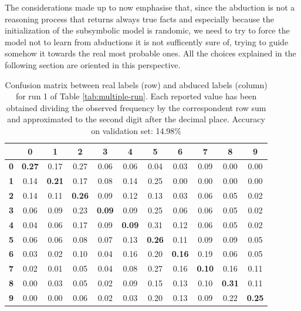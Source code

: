 The considerations made up to now emphasise that, since the abduction is not a reasoning process that returns always true facts and especially because the initialization of the subsymbolic model is randomic, we need to try to force the model not to learn from abductions it is not sufficently sure of, trying to guide somehow it towards the real most probable ones. All the choices explained in the following section are oriented in this perspective.

\begin{table}[H]
  \caption{Confusion matrix between real labels (row) and abduced labels (column) for run 1 of Table \ref{tab:multiple-run}. Each reported value has been obtained dividing the observed frequency by the correspondent row sum and approximated to the second digit after the decimal place. Accuracy on validation set: 14.98\%}
  \label{tab:confusion-matrix-1}
  \centering
  \begin{tabular}{ccccccccccc}  
						& \textbf{0} & \textbf{1} & \textbf{2} & \textbf{3} & \textbf{4} & \textbf{5} & \textbf{6} & \textbf{7} & \textbf{8} & \textbf{9}\\
	\hline
	\textbf{0}			& \textbf{0.27} & 0.17 & 0.27 & 0.06 & 0.06 & 0.04 & 0.03 & 0.09 & 0.00 & 0.00  \\
	\hline
	\textbf{1}			& 0.14 & \textbf{0.21} & 0.17 & 0.08 & 0.14 & 0.25 & 0.00 & 0.00 & 0.00 & 0.00  \\
	\hline
	\textbf{2}			& 0.14 & 0.11 & \textbf{0.26} & 0.09 & 0.12 & 0.13 & 0.03 & 0.06 & 0.05 & 0.02  \\
	\hline
	\textbf{3} 			& 0.06 & 0.09 & 0.23 & \textbf{0.09} & 0.09 & 0.25 & 0.06 & 0.06 & 0.05 & 0.02  \\
	\hline
	\textbf{4} 			& 0.04 & 0.06 & 0.17 & 0.09 & \textbf{0.09} & 0.31 & 0.12 & 0.06 & 0.05 & 0.02  \\
	\hline
	\textbf{5} 			& 0.06 & 0.06 & 0.08 & 0.07 & 0.13 & \textbf{0.26} & 0.11 & 0.09 & 0.09 & 0.05  \\
	\hline
	\textbf{6} 			& 0.03 & 0.02 & 0.10 & 0.04 & 0.16 & 0.20 & \textbf{0.16} & 0.19 & 0.06 & 0.05  \\
	\hline
	\textbf{7} 			& 0.02 & 0.01 & 0.05 & 0.04 & 0.08 & 0.27 & 0.16 & \textbf{0.10} & 0.16 & 0.11  \\
	\hline
	\textbf{8} 			& 0.00 & 0.03 & 0.05 & 0.02 & 0.09 & 0.15 & 0.13 & 0.10 & \textbf{0.31} & 0.11  \\
	\hline
	\textbf{9} 			& 0.00 & 0.00 & 0.06 & 0.02 & 0.03 & 0.20 & 0.13 & 0.09 & 0.22 & \textbf{0.25}  \\
	\bottomrule
	\end{tabular}
\end{table}

